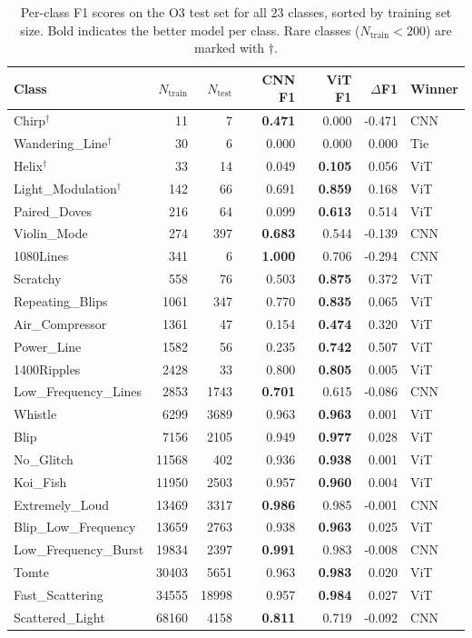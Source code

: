 \begin{table}
\centering
\caption{Per-class F1 scores on the O3 test set for all 23 classes, sorted by training set size. Bold indicates the better model per class. Rare classes ($N_\mathrm{train} < 200$) are marked with $\dagger$.}
\label{tab:perclass}
\begin{tabular}{lrrrrrl}
\hline\hline
Class & $N_\mathrm{train}$ & $N_\mathrm{test}$ & CNN F1 & ViT F1 & $\Delta$F1 & Winner \\
\hline
Chirp$^\dagger$ & 11 & 7 & \textbf{0.471} & 0.000 & -0.471 & CNN \\
Wandering\_Line$^\dagger$ & 30 & 6 & 0.000 & 0.000 & 0.000 & Tie \\
Helix$^\dagger$ & 33 & 14 & 0.049 & \textbf{0.105} & 0.056 & ViT \\
Light\_Modulation$^\dagger$ & 142 & 66 & 0.691 & \textbf{0.859} & 0.168 & ViT \\
Paired\_Doves & 216 & 64 & 0.099 & \textbf{0.613} & 0.514 & ViT \\
Violin\_Mode & 274 & 397 & \textbf{0.683} & 0.544 & -0.139 & CNN \\
1080Lines & 341 & 6 & \textbf{1.000} & 0.706 & -0.294 & CNN \\
Scratchy & 558 & 76 & 0.503 & \textbf{0.875} & 0.372 & ViT \\
Repeating\_Blips & 1061 & 347 & 0.770 & \textbf{0.835} & 0.065 & ViT \\
Air\_Compressor & 1361 & 47 & 0.154 & \textbf{0.474} & 0.320 & ViT \\
Power\_Line & 1582 & 56 & 0.235 & \textbf{0.742} & 0.507 & ViT \\
1400Ripples & 2428 & 33 & 0.800 & \textbf{0.805} & 0.005 & ViT \\
Low\_Frequency\_Lines & 2853 & 1743 & \textbf{0.701} & 0.615 & -0.086 & CNN \\
Whistle & 6299 & 3689 & 0.963 & \textbf{0.963} & 0.001 & ViT \\
Blip & 7156 & 2105 & 0.949 & \textbf{0.977} & 0.028 & ViT \\
No\_Glitch & 11568 & 402 & 0.936 & \textbf{0.938} & 0.001 & ViT \\
Koi\_Fish & 11950 & 2503 & 0.957 & \textbf{0.960} & 0.004 & ViT \\
Extremely\_Loud & 13469 & 3317 & \textbf{0.986} & 0.985 & -0.001 & CNN \\
Blip\_Low\_Frequency & 13659 & 2763 & 0.938 & \textbf{0.963} & 0.025 & ViT \\
Low\_Frequency\_Burst & 19834 & 2397 & \textbf{0.991} & 0.983 & -0.008 & CNN \\
Tomte & 30403 & 5651 & 0.963 & \textbf{0.983} & 0.020 & ViT \\
Fast\_Scattering & 34555 & 18998 & 0.957 & \textbf{0.984} & 0.027 & ViT \\
Scattered\_Light & 68160 & 4158 & \textbf{0.811} & 0.719 & -0.092 & CNN \\
\hline\hline
\end{tabular}
\end{table}